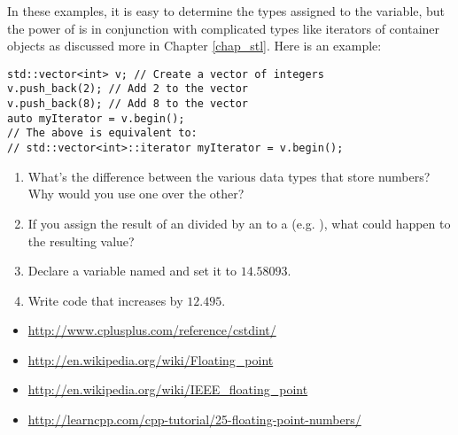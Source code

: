 In these examples, it is easy to determine the types assigned to the variable, but the power of  is in conjunction with complicated types like iterators of container objects as discussed more in Chapter \ref{chap_stl}. Here is an example:

\noindent\begin{minipage}{\linewidth}\begin{lstlisting}
std::vector<int> v; // Create a vector of integers
v.push_back(2); // Add 2 to the vector
v.push_back(8); // Add 8 to the vector
auto myIterator = v.begin();
// The above is equivalent to:
// std::vector<int>::iterator myIterator = v.begin();
\end{lstlisting}\end{minipage}


\begin{enumerate}
	\item What's the difference between the various data types that store numbers? Why would you use one over the other?

	\item If you assign the result of an  divided by an  to a  (e.g. ), what could happen to the resulting value?

  \item Declare a variable named  and set it to $14.58093$.

 	\item Write code that increases  by $12.495$. 

\end{enumerate}




\begin{itemize}
\item \url{http://www.cplusplus.com/reference/cstdint/}
\item \url{http://en.wikipedia.org/wiki/Floating_point}
\item \url{http://en.wikipedia.org/wiki/IEEE_floating_point}
\item \url{http://learncpp.com/cpp-tutorial/25-floating-point-numbers/}
\end{itemize}	

